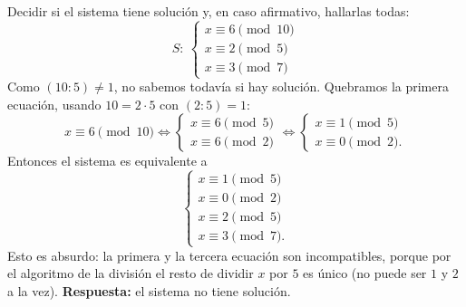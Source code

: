 \begin{ejemplo}
Decidir si el sistema tiene solución y, en caso afirmativo, hallarlas todas:
\[
S:\ \begin{cases}
x\equiv 6 \pmod{10}\\
x\equiv 2 \pmod{5}\\
x\equiv 3 \pmod{7}
\end{cases}
\]
Como $(10:5)\neq 1$, no sabemos todavía si hay solución. Quebramos la primera
ecuación, usando $10=2\cdot 5$ con $(2:5)=1$:
\[
x\equiv 6 \pmod{10} \iff
\begin{cases}
x\equiv 6 \pmod 5\\
x\equiv 6 \pmod 2
\end{cases}
\iff
\begin{cases}
x\equiv 1 \pmod 5\\
x\equiv 0 \pmod 2.
\end{cases}
\]
Entonces el sistema es equivalente a
\[
\begin{cases}
x\equiv 1 \pmod 5\\
x\equiv 0 \pmod 2\\
x\equiv 2 \pmod 5\\
x\equiv 3 \pmod 7.
\end{cases}
\]
Esto es absurdo: la primera y la tercera ecuación son incompatibles, porque por
el algoritmo de la división el resto de dividir $x$ por $5$ es único (no puede
ser $1$ y $2$ a la vez). \textbf{Respuesta:} el sistema no tiene solución.
\end{ejemplo}

